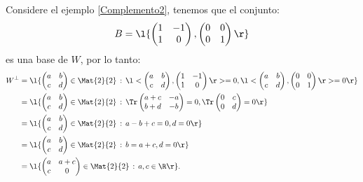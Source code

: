 \documentclass[compacto,10pt]{pubciencias-notas}
\begin{document}
\begin{ejem}\hspace{0pt}\label{Complemento3} Considere el ejemplo \ref{Complemento2}, tenemos que el conjunto:
\[
    B = \l\{\begin{pmatrix}1&- 1\\1&0\end{pmatrix}, \begin{pmatrix}0&0\\0&1\end{pmatrix}\r\}
\]
es una base de $W$, por lo tanto:
\begin{align*}
    W^{\perp} 
    &= \l\{\begin{pmatrix}a&b\\c&d\end{pmatrix}\in\Mat{2}{2}\,:\,
    \l<\begin{pmatrix}a&b\\c&d\end{pmatrix}, \begin{pmatrix}1& -1\\1&0\end{pmatrix}\r> = 0,
    \l<\begin{pmatrix}a&b\\c&d\end{pmatrix}, \begin{pmatrix}0&0\\0&1\end{pmatrix}\r> = 0\r\}\\
    &= \l\{\begin{pmatrix}a&b\\c&d\end{pmatrix}\in\Mat{2}{2}\,:\,
    \Tr\begin{pmatrix}a + c& -a\\b + d&- b\end{pmatrix} = 0,
    \Tr\begin{pmatrix}0&c\\0&d\end{pmatrix} = 0\r\}\\
    &= \l\{\begin{pmatrix}a&b\\c&d\end{pmatrix}\in\Mat{2}{2}\,:\,
    a - b + c = 0, d = 0\r\}\\
    &= \l\{\begin{pmatrix}a&b\\c&d\end{pmatrix}\in\Mat{2}{2}\,:\,
    b = a + c, d = 0\r\}\\
    &= \l\{\begin{pmatrix}a&a + c\\c&0\end{pmatrix}\in\Mat{2}{2}\,:\,
    a, c \in \R\r\}.
\end{align*}
\end{ejem}
\end{document}
